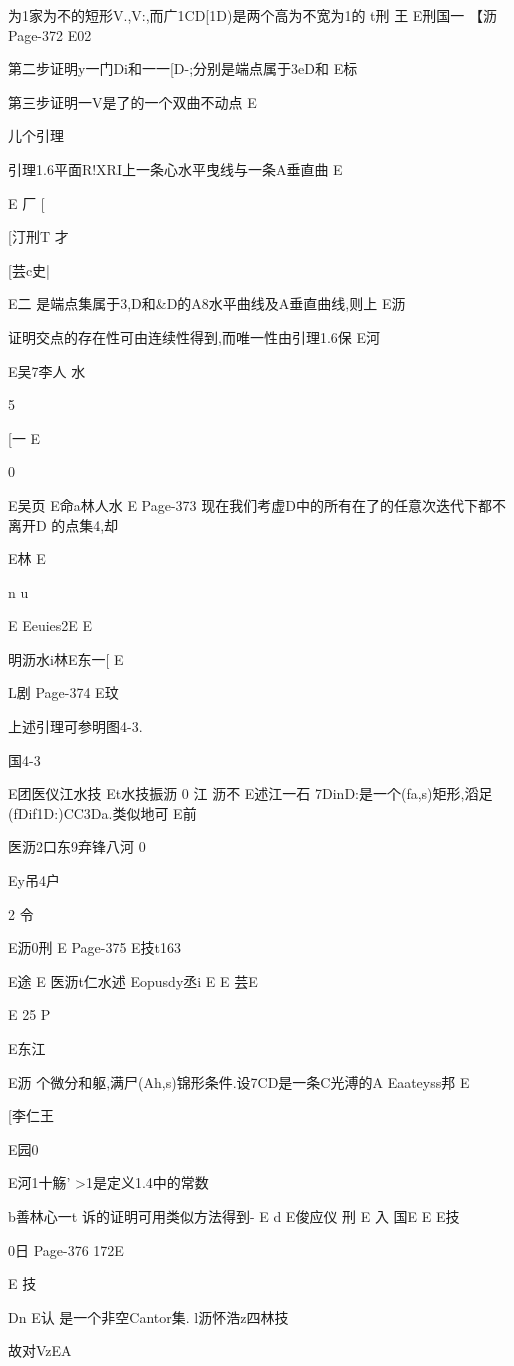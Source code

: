 {{{{{{{{{{{{{{{为1家为不的短形V.,V:,而广1CD[1D)是两个高为不宽为1的
t刑
王
E刑国一
【沥
Page-372
E02

第二步证明y一门Di和一一[D-;分别是端点属于3eD和
E标

第三步证明一V是了的一个双曲不动点
E

儿个引理

引理1.6平面R!XRI上一条心水平曳线与一条A垂直曲
E

E
厂
[

[汀刑T
才

[芸c史|

E二
是端点集属于3,D和&D的A8水平曲线及A垂直曲线,则上
E沥

证明交点的存在性可由连续性得到,而唯一性由引理1.6保
E河

E吴7李人
水

5

[一
E

0

E吴页
E命a林人水
E
Page-373
现在我们考虚D中的所有在了的任意次迭代下都不离开D
的点集4,却

E林
E

n
u

E
Eeuies2E
E

明沥水i林E东一[
E

L剧
Page-374
E玟

上述引理可参明图4-3.

国4-3

E团医仪江水技
Et水技振沥
0
江
沥不
E述江一石
7DinD:是一个(fa,s)矩形,滔足(fDif1D:)CC3Da.类似地可
E前

医沥2口东9弃锋八河
0

Ey吊4户

2
令

E沥0刑
E
Page-375
E技t163

E途
E
医沥t仁水述
Eopusdy丞i
E
E
芸E

E
25
P

E东江

E沥
个微分和躯,满尸(Ah,s)锦形条件.设7CD是一条C光溥的A
Eaateyss邦
E

[李仁王

E园0

E河1十觞'
>1是定义1.4中的常数

b善林心一t
诉的证明可用类似方法得到-
E
d
E俊应仪
刑
E
入
国E
E
E技

0日
Page-376
172E

E
技

Dn
E认
是一个非空Cantor集.
l沥怀浩z四林技

故对VzEA

}}}}}}}}}}}}}}}
